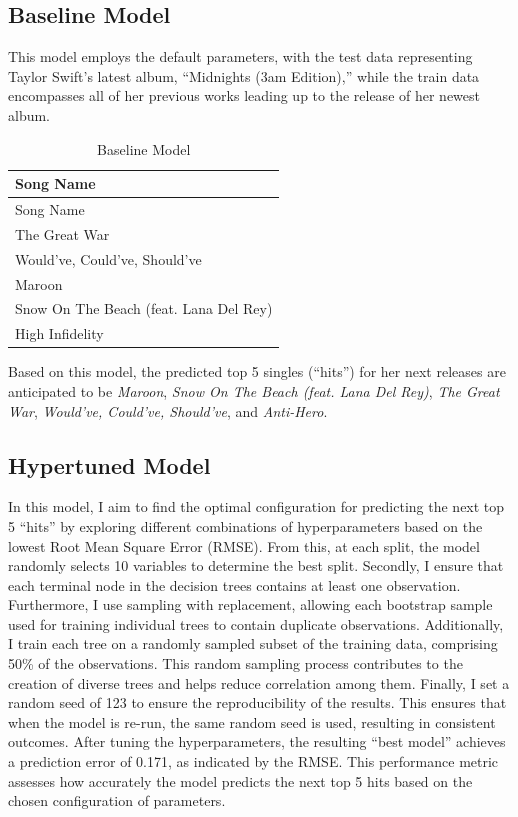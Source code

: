 \documentclass[11pt,preprint, authoryear]{elsarticle}
\numberwithin{equation}{section}
\numberwithin{figure}{section}
\numberwithin{table}{section}
\begin{document}
\hypertarget{baseline-model}{%
\subsection*{Baseline Model}\label{baseline-model}}

This model employs the default parameters, with the test data
representing Taylor Swift's latest album, ``Midnights (3am Edition),''
while the train data encompasses all of her previous works leading up to
the release of her newest album.

\begin{longtable}[]{@{}l@{}}
\caption{Baseline Model}\tabularnewline
\toprule()
Song Name \\
\midrule()
\endfirsthead
\toprule()
Song Name \\
\midrule()
\endhead
The Great War \\
Would've, Could've, Should've \\
Maroon \\
Snow On The Beach (feat. Lana Del Rey) \\
High Infidelity \\
\bottomrule()
\end{longtable}

Based on this model, the predicted top 5 singles (``hits'') for her next
releases are anticipated to be \emph{Maroon}, \emph{Snow On The Beach
(feat. Lana Del Rey)}, \emph{The Great War}, \emph{Would've, Could've,
Should've}, and \emph{Anti-Hero}.

\hypertarget{hypertuned-model}{%
\subsection*{Hypertuned Model}\label{hypertuned-model}}

In this model, I aim to find the optimal configuration for predicting
the next top 5 ``hits'' by exploring different combinations of
hyperparameters based on the lowest Root Mean Square Error (RMSE). From
this, at each split, the model randomly selects 10 variables to
determine the best split. Secondly, I ensure that each terminal node in
the decision trees contains at least one observation. Furthermore, I use
sampling with replacement, allowing each bootstrap sample used for
training individual trees to contain duplicate observations.
Additionally, I train each tree on a randomly sampled subset of the
training data, comprising 50\% of the observations. This random sampling
process contributes to the creation of diverse trees and helps reduce
correlation among them. Finally, I set a random seed of 123 to ensure
the reproducibility of the results. This ensures that when the model is
re-run, the same random seed is used, resulting in consistent outcomes.
After tuning the hyperparameters, the resulting ``best model'' achieves
a prediction error of 0.171, as indicated by the RMSE. This performance
metric assesses how accurately the model predicts the next top 5 hits
based on the chosen configuration of parameters.
\end{document}
